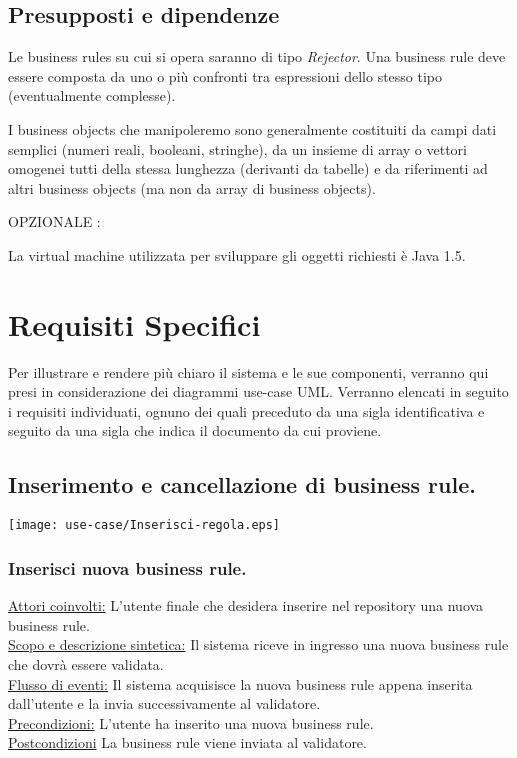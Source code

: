 \section{Presupposti e dipendenze}
\begin{itemize}
\item{Le business rules su cui si opera saranno di tipo \textit{Rejector}. Una business rule deve essere composta da uno o pi\`u confronti tra espressioni dello stesso tipo (eventualmente complesse).}
\item{I business objects che manipoleremo sono generalmente costituiti da campi dati semplici (numeri reali, booleani, stringhe), da un insieme di array o vettori omogenei tutti della stessa lunghezza (derivanti da tabelle) e da riferimenti ad altri business objects (ma non da array di business objects). \item[NQ4]{ OPZIONALE :   }
}
\item{La virtual machine utilizzata  per sviluppare gli oggetti richiesti \`e Java 1.5.}
\end{itemize}

\chapter{Requisiti Specifici}
Per illustrare e rendere pi\`u chiaro il sistema e le sue componenti, verranno qui presi in considerazione dei diagrammi use-case UML. Verranno elencati in seguito i requisiti individuati, ognuno dei quali preceduto da una sigla identificativa e seguito da una sigla che indica il documento da cui proviene.


\section{Inserimento e cancellazione di business rule.}
\begin{center}
 \texttt{[image: use-case/Inserisci-regola.eps]}
\end{center}

\subsection{Inserisci nuova business rule.}
\underline{Attori coinvolti:} L'utente finale che desidera inserire nel repository una nuova business rule.\\
\underline{Scopo e descrizione sintetica:} Il sistema riceve in ingresso una nuova business rule che dovr\`a essere validata.\\
\underline{Flusso di eventi:} Il sistema acquisisce la nuova business rule appena inserita dall'utente e la invia successivamente al validatore.\\
\underline{Precondizioni:} L'utente ha inserito una nuova business rule.\\
\underline{Postcondizioni} La business rule viene inviata al validatore.

